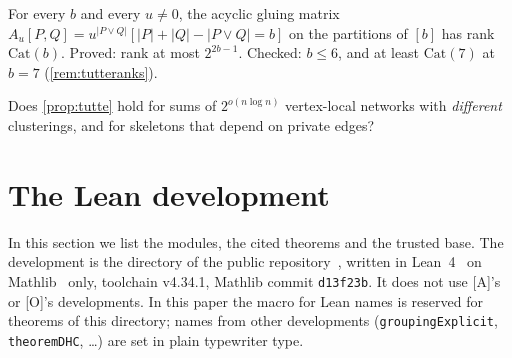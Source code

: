 \documentclass[10pt]{amsart}
\theoremstyle{plain}
\theoremstyle{definition}
\theoremstyle{remark}
\numberwithin{equation}{section}
\newcommand{\A}{\textup{[A]}}
\newcommand{\Oa}{\textup{[O]}}
\begin{document}
\begin{conjecture}[Catalan rank on $y=1$; \repo{tutte-plane.md} Lemma~3.2(c)]\label{conj:catalan}
For every $b$ and every $u\ne0$, the acyclic gluing matrix
$A_u[P,Q]=u^{|P\vee Q|}[|P|+|Q|-|P\vee Q|=b]$ on the partitions of $[b]$ has rank $\mathrm{Cat}(b)$.
Proved: rank at most $2^{2b-1}$. Checked: $b\le6$, and at least $\mathrm{Cat}(7)$ at $b=7$
(\cref{rem:tutteranks}).
\end{conjecture}

\begin{question}\label{q:tutte}
Does \cref{prop:tutte} hold for sums of $2^{o(n\log n)}$ vertex-local networks with \emph{different}
clusterings, and for skeletons that depend on private edges?
\end{question}

\section{The Lean development}\label{sec:lean}

In this section we list the modules, the cited theorems and the trusted base. The development is the
directory  of the public repository~\cite{TulsyanRepo26}, written in Lean~4~\cite{Lean4} on
Mathlib~\cite{Mathlib20} only, toolchain v4.34.1, Mathlib commit \texttt{d13f23b}. It does not use \A's or \Oa's developments. In this paper
the macro for Lean names is reserved for theorems of this directory; names from other developments
(\texttt{groupingExplicit}, \texttt{theoremDHC}, \dots) are set in plain typewriter type.
\end{document}
